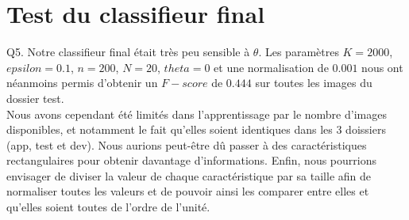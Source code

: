 \documentclass[a4paper,11pt]{article}
\begin{document}
\section{Test du classifieur final}

Q5. Notre classifieur final était très peu sensible à $\theta$. Les paramètres $K=2000$, $epsilon = 0.1$, $n = 200$, $N = 20$, $theta = 0$ et une normalisation de $0.001$ nous ont néanmoins permis d’obtenir un $F-score$ de $0.444$ sur toutes les images du dossier test.\\

Nous avons cependant été limités dans l’apprentissage par le nombre d’images disponibles, et notamment le fait qu’elles soient identiques dans les 3 doissiers (app, test et dev). Nous aurions peut-être dû passer à des caractéristiques rectangulaires pour obtenir davantage d’informations. Enfin, nous pourrions envisager de diviser la valeur de chaque caractéristique par sa taille afin de normaliser toutes les valeurs et de pouvoir ainsi les comparer entre elles et qu’elles soient toutes de l’ordre de l’unité.
\end{document}
